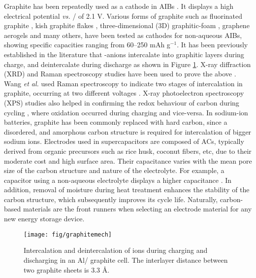 \documentclass{article}
\begin{document}
Graphite has been repeatedly used as a cathode in AIBs \cite{lin_ultrafast_2015, wang_advanced_2017,zhang_novel_2016}. It displays a high electrical potential {\it vs.} /  of 2.1 V. Various forms of graphite such as fluorinated graphite \cite{rani_fluorinated_2013}, kish graphite flakes \cite{wang_kish_2017}, three-dimensional (3D) graphitic-foam \cite{wu_3d_2016}, graphene aerogels \cite{huang_graphene_2019} and many others, have been tested as cathodes for non-aqueous AIBs, showing specific capacities ranging from 60--250 mAh g$^{-1}$. It has been previously established in the literature that -anions intercalate into graphitic layers during charge, and deintercalate during discharge as shown in Figure \ref{fig:graphitemech}. X-ray diffraction (XRD) and Raman spectroscopy studies have been used to prove the above \cite{wang_advanced_2017, rani_fluorinated_2013}. Wang \textit{et al.} used Raman spectroscopy to indicate two stages of intercalation in graphite, occurring at two different voltages \cite{wang_advanced_2017}. X-ray photoelectron spectroscopy (XPS) studies also helped in confirming the redox behaviour of carbon during cycling \cite{stadie_zeolite-templated_2017, liu_binder-free_2019,wei_amorphous_2017}, where oxidation occurred during charging and vice-versa. In sodium-ion batteries, graphite has been commonly replaced with hard carbon, \cite{yu_mixed_nodate} since a disordered, and amorphous carbon structure is required for intercalation of bigger sodium ions. Electrodes used in supercapacitors are composed of ACs, typically derived from organic precursors such as rice husk, coconut fibers, etc, due to their moderate cost and high surface area. Their capacitance varies with the mean pore size of the carbon structure and nature of the electrolyte. For example, a capacitor using a non-aqueous electrolyte displays a higher capacitance \cite{simon_materials_2008}. In addition, removal of moisture during heat treatment enhances the stability of the carbon structure, which subsequently improves its cycle life. Naturally, carbon-based materials are the front runners when selecting an electrode material for any new energy storage device. 
\begin{figure}[] %
  \centering
  \texttt{[image: fig/graphitemech]}
    \caption{Intercalation and deintercalation of  ions during charging and discharging in an Al/ graphite cell. The interlayer distance between two graphite sheets is 3.3 \AA.}
  \label{fig:graphitemech}
\end{figure}
\end{document}
